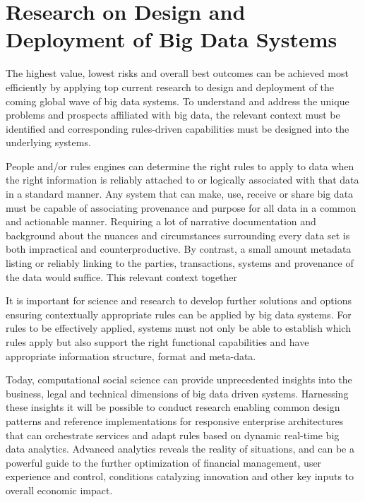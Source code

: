 \section{Research on Design and Deployment of Big Data Systems}

The highest value, lowest risks and overall best outcomes can be achieved most efficiently by applying top current research to design and deployment of the coming global wave of big data systems. To understand and address the unique problems and prospects affiliated with big data, the relevant context must be identified and corresponding rules-driven capabilities must be designed into the underlying systems.

People and/or rules engines can determine the right rules to apply to data when the right information is reliably attached to or logically associated with that data in a standard manner. Any system that can make, use, receive or share big data must be capable of associating provenance and purpose for all data in a common and actionable manner. Requiring a lot of narrative documentation and background about the nuances and circumstances surrounding every data set is both impractical and counterproductive. By contrast, a small amount metadata listing or reliably linking to the parties, transactions, systems and provenance of the data would suffice. This relevant context together

It is important for science and research to develop further solutions and options ensuring contextually appropriate rules can be applied by big data systems. For rules to be effectively applied, systems must not only be able to establish which rules apply but also support the right functional capabilities and have appropriate information structure, format and meta-data.

Today, computational social science can provide unprecedented insights into the business, legal and technical dimensions of big data driven systems. Harnessing these insights it will be possible to conduct research enabling common design patterns and reference implementations for responsive enterprise architectures that can orchestrate services and adapt rules based on dynamic real-time big data analytics. Advanced analytics reveals the reality of situations, and can be a powerful guide to the further optimization of financial management, user experience and control, conditions catalyzing innovation and other key inputs to overall economic impact.


